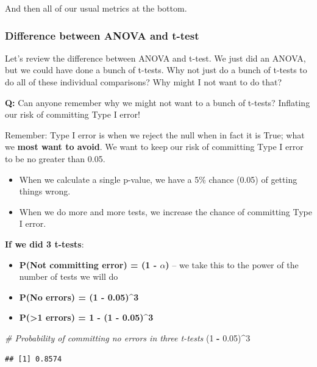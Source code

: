 \documentclass[
]{article}
\newenvironment{Shaded}{\begin{snugshade}}{\end{snugshade}}
\newcommand{\CommentTok}[1]{\textcolor[rgb]{0.56,0.35,0.01}{\textit{#1}}}
\newcommand{\DecValTok}[1]{\textcolor[rgb]{0.00,0.00,0.81}{#1}}
\newcommand{\FloatTok}[1]{\textcolor[rgb]{0.00,0.00,0.81}{#1}}
\newcommand{\NormalTok}[1]{#1}
\newcommand{\SpecialCharTok}[1]{\textcolor[rgb]{0.81,0.36,0.00}{\textbf{#1}}}
\providecommand{\tightlist}{%
  \setlength{\itemsep}{0pt}\setlength{\parskip}{0pt}}
\begin{document}
And then all of our usual metrics at the bottom.

\subsubsection{Difference between ANOVA and
t-test}\label{difference-between-anova-and-t-test}

Let's review the difference between ANOVA and t-test. We just did an
ANOVA, but we could have done a bunch of t-tests. Why not just do a
bunch of t-tests to do all of these individual comparisons? Why might I
not want to do that?

\textbf{Q:} Can anyone remember why we might not want to a bunch of
t-tests? Inflating our risk of committing Type I error!

Remember: Type I error is when we reject the null when in fact it is
True; what we \textbf{most want to avoid}. We want to keep our risk of
committing Type I error to be no greater than 0.05.

\begin{itemize}
\tightlist
\item
  When we calculate a single p-value, we have a 5\% chance (0.05) of
  getting things wrong.
\item
  When we do more and more tests, we increase the chance of committing
  Type I error.
\end{itemize}

\textbf{If we did 3 t-tests}:

\begin{itemize}
\tightlist
\item
  \textbf{P(Not committing error) = (1 - \(\alpha\))} -- we take this to
  the power of the number of tests we will do
\item
  \textbf{P(No errors) = (1 - 0.05)\^{}3}
\item
  \textbf{P(\textgreater1 errors) = 1 - (1 - 0.05)\^{}3}
\end{itemize}

\begin{Shaded}
\begin{Highlighting}[]
\CommentTok{\# Probability of committing no errors in three t{-}tests}
\NormalTok{(}\DecValTok{1} \SpecialCharTok{{-}} \FloatTok{0.05}\NormalTok{)}\SpecialCharTok{\^{}}\DecValTok{3}
\end{Highlighting}
\end{Shaded}

\begin{verbatim}
## [1] 0.8574
\end{verbatim}
\end{document}

